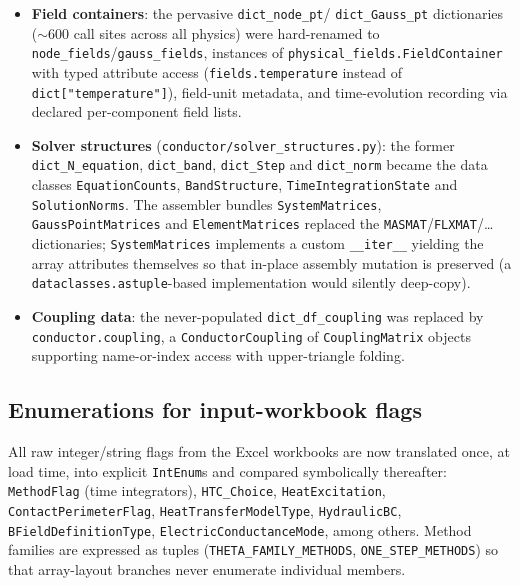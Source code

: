\documentclass[11pt,a4paper]{article}
\newcommand{\code}[1]{\texttt{#1}}
\begin{document}
\begin{itemize}
  \item \textbf{Field containers}: the pervasive \code{dict\_node\_pt}/%
        \code{dict\_Gauss\_pt} dictionaries ($\sim$600 call sites across all physics)
        were hard-renamed to \code{node\_fields}/\code{gauss\_fields}, instances of
        \code{physical\_fields.FieldContainer} with typed attribute access
        (\code{fields.temperature} instead of \code{dict["temperature"]}), field-unit
        metadata, and time-evolution recording via declared per-component field lists.
  \item \textbf{Solver structures} (\code{conductor/solver\_structures.py}): the former
        \code{dict\_N\_equation}, \code{dict\_band}, \code{dict\_Step} and
        \code{dict\_norm} became the data classes \code{EquationCounts},
        \code{BandStructure}, \code{TimeIntegrationState} and \code{SolutionNorms}.
        The assembler bundles \code{SystemMatrices}, \code{GaussPointMatrices} and
        \code{ElementMatrices} replaced the \code{MASMAT}/\code{FLXMAT}/\ldots{}
        dictionaries; \code{SystemMatrices} implements a custom \code{\_\_iter\_\_}
        yielding the array attributes themselves so that in-place assembly mutation is
        preserved (a \code{dataclasses.astuple}-based implementation would silently
        deep-copy).
  \item \textbf{Coupling data}: the never-populated \code{dict\_df\_coupling} was
        replaced by \code{conductor.coupling}, a \code{ConductorCoupling} of
        \code{CouplingMatrix} objects supporting name-or-index access with
        upper-triangle folding.
\end{itemize}

\subsection{Enumerations for input-workbook flags}

All raw integer/string flags from the Excel workbooks are now translated once, at load
time, into explicit \code{IntEnum}s and compared symbolically thereafter:
\code{MethodFlag} (time integrators), \code{HTC\_Choice}, \code{HeatExcitation},
\code{ContactPerimeterFlag}, \code{HeatTransferModelType}, \code{HydraulicBC},
\code{BFieldDefinitionType}, \code{ElectricConductanceMode}, among others. Method
families are expressed as tuples (\code{THETA\_FAMILY\_METHODS},
\code{ONE\_STEP\_METHODS}) so that array-layout branches never enumerate individual
members.
\end{document}
